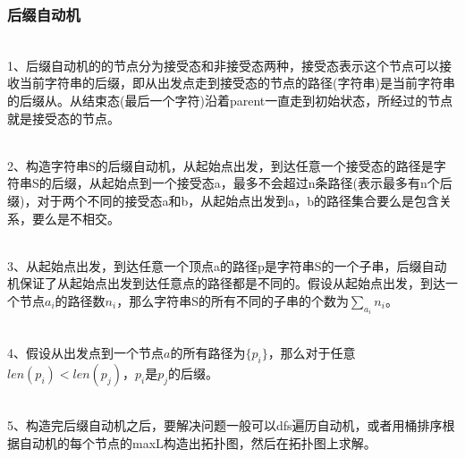 \subsubsection{后缀自动机} 
~\\
1、后缀自动机的的节点分为接受态和非接受态两种，接受态表示这个节点可以接收当前字符串的后缀，即从出发点走到接受态的节点的路径(字符串)是当前字符串的后缀从。从结束态(最后一个字符)沿着parent一直走到初始状态，所经过的节点就是接受态的节点。\par
~\\
2、构造字符串S的后缀自动机，从起始点出发，到达任意一个接受态的路径是字符串S的后缀，从起始点到一个接受态a，最多不会超过n条路径(表示最多有n个后缀)，对于两个不同的接受态a和b，从起始点出发到a，b的路径集合要么是包含关系，要么是不相交。\par
~\\
3、从起始点出发，到达任意一个顶点a的路径p是字符串S的一个子串，后缀自动机保证了从起始点出发到达任意点的路径都是不同的。假设从起始点出发，到达一个节点$a_i$的路径数$n_i$，那么字符串S的所有不同的子串的个数为$\sum_{a_i}n_i$。\par
~\\
4、假设从出发点到一个节点$a$的所有路径为$\{p_i\}$，那么对于任意$len(p_i) < len(p_j)$，$p_i$是$p_j$的后缀。\par
~\\
5、构造完后缀自动机之后，要解决问题一般可以dfs遍历自动机，或者用桶排序根据自动机的每个节点的maxL构造出拓扑图，然后在拓扑图上求解。\par
~\\

